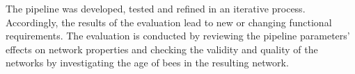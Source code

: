 The pipeline was developed, tested and refined in an iterative process.
Accordingly, the results of the evaluation lead to new or changing functional requirements.
The evaluation is conducted by reviewing the pipeline parameters' effects on network properties and checking the validity and quality of the networks by investigating the age of bees in the resulting network.








